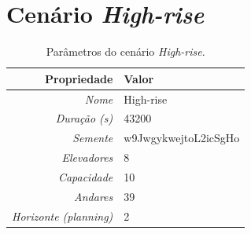 \section{Cenário \textit{High-rise}}

\lipsum[1]

\begin{table}[htb!]
\centering
\caption{Parâmetros do cenário \textit{High-rise}.}
\label{tab:results:highrise:params}
\begin{tabular}{|r|l|}
\hline
\textbf{Propriedade}          & \textbf{Valor}       \\ \hline
\textit{Nome}                 & High-rise            \\ \hline
\textit{Duração (s)}          & 43200                \\ \hline
\textit{Semente}              & w9JwgykwejtoL2icSgHo \\ \hline
\textit{Elevadores}           & 8                    \\ \hline
\textit{Capacidade}           & 10                   \\ \hline
\textit{Andares}              & 39                   \\ \hline
\textit{Horizonte (planning)} & 2                    \\ \hline
\end{tabular}
\end{table}


